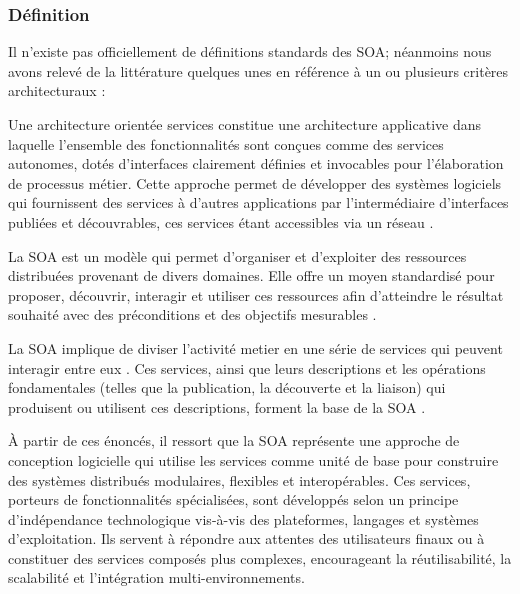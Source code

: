 \subsubsection{Définition}
Il n'existe pas officiellement de définitions standards des SOA; néanmoins nous avons relevé de la littérature quelques unes %
en référence à un ou plusieurs critères architecturaux :
\begin{definition}
    Une architecture orientée services constitue une architecture applicative dans laquelle l'ensemble des fonctionnalités sont conçues comme des services autonomes, dotés d'interfaces clairement définies et invocables pour l'élaboration de processus métier. Cette approche permet de développer des systèmes logiciels qui fournissent des services à d'autres applications par l'intermédiaire d'interfaces publiées et découvrables, ces services étant accessibles via un réseau \cite{channabasavaiah2003migrating}.
\end{definition}
\begin{definition}
    La SOA est un modèle qui permet d'organiser et d'exploiter des ressources distribuées provenant de divers domaines. Elle offre un moyen standardisé pour proposer, découvrir, interagir et utiliser ces ressources afin d'atteindre le résultat souhaité avec des préconditions et des objectifs mesurables \cite{josuttis2007soa}.
\end{definition}
\begin{definition}
    La SOA implique de diviser l'activité metier en une série de services qui peuvent interagir entre eux \cite{papazoglou2007service}. Ces services, ainsi que leurs descriptions et les opérations fondamentales (telles que la publication, la découverte et la liaison) qui produisent ou utilisent ces descriptions, forment la base de la SOA \cite{papazoglou2003service}.
\end{definition}
À partir de ces énoncés, il ressort que la SOA représente une approche de conception logicielle qui utilise les services comme unité de base pour construire des systèmes distribués modulaires, flexibles et interopérables. Ces services, porteurs de fonctionnalités spécialisées, sont développés selon un principe d'indépendance technologique vis-à-vis des plateformes, langages et systèmes d'exploitation. Ils servent à répondre aux attentes des utilisateurs finaux ou à constituer des services composés plus complexes, encourageant la réutilisabilité, la scalabilité et l'intégration multi-environnements.

